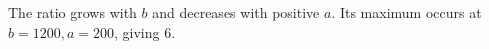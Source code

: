 The ratio grows with $b$ and decreases with positive $a$. Its maximum occurs at $b=1200,a=200$, giving $\boxed6$.
